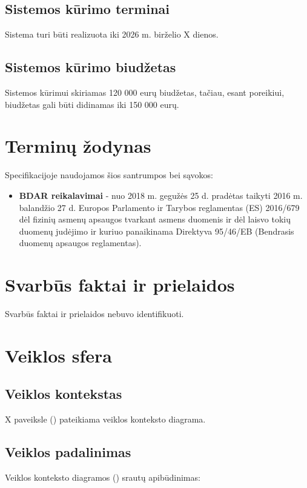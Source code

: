 \documentclass[12pt]{article}
\begin{document}
\newpage

\subsection{Sistemos kūrimo terminai}
Sistema turi būti realizuota iki 2026 m. birželio X dienos.

\subsection{Sistemos kūrimo biudžetas}
Sistemos kūrimui skiriamas 120 000 eurų biudžetas, tačiau, esant poreikiui,
biudžetas gali būti didinamas iki 150 000 eurų.

\newpage

\section{Terminų žodynas}
Specifikacijoje naudojamos šios santrumpos bei sąvokos:
\begin{itemize}
    \item \textbf{BDAR reikalavimai} - nuo 2018 m. gegužės 25 d. pradėtas
    taikyti 2016 m. balandžio 27 d. Europos Parlamento ir Tarybos reglamentas
    (ES) 2016/679 dėl fizinių asmenų apsaugos tvarkant asmens duomenis ir dėl
    laisvo tokių duomenų judėjimo ir kuriuo panaikinama Direktyva 95/46/EB
    (Bendrasis duomenų apsaugos reglamentas).
\end{itemize}

\newpage

\section{Svarbūs faktai ir prielaidos}
Svarbūs faktai ir prielaidos nebuvo identifikuoti.

\section{Veiklos sfera} %
\subsection{Veiklos kontekstas} %
X paveiksle () pateikiama veiklos konteksto diagrama.

\subsection{Veiklos padalinimas}
Veiklos konteksto diagramos () srautų apibūdinimas:
\end{document}

